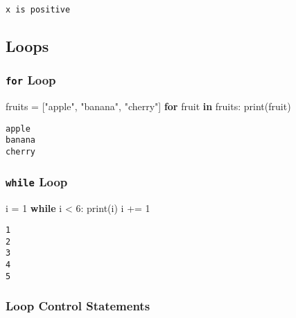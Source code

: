 \documentclass[
  letterpaper,
  DIV=11,
  numbers=noendperiod]{scrreprt}
\newenvironment{Shaded}{\begin{snugshade}}{\end{snugshade}}
\newcommand{\BuiltInTok}[1]{\textcolor[rgb]{0.00,0.23,0.31}{#1}}
\newcommand{\ControlFlowTok}[1]{\textcolor[rgb]{0.00,0.23,0.31}{\textbf{#1}}}
\newcommand{\DecValTok}[1]{\textcolor[rgb]{0.68,0.00,0.00}{#1}}
\newcommand{\KeywordTok}[1]{\textcolor[rgb]{0.00,0.23,0.31}{\textbf{#1}}}
\newcommand{\NormalTok}[1]{\textcolor[rgb]{0.00,0.23,0.31}{#1}}
\newcommand{\OperatorTok}[1]{\textcolor[rgb]{0.37,0.37,0.37}{#1}}
\newcommand{\StringTok}[1]{\textcolor[rgb]{0.13,0.47,0.30}{#1}}
\begin{document}
\begin{verbatim}
x is positive
\end{verbatim}

\subsection{Loops}\label{loops-1}

\subsubsection{\texorpdfstring{\texttt{for}
Loop}{for Loop}}\label{for-loop-1}

\begin{Shaded}
\begin{Highlighting}[]
\NormalTok{fruits }\OperatorTok{=}\NormalTok{ [}\StringTok{"apple"}\NormalTok{, }\StringTok{"banana"}\NormalTok{, }\StringTok{"cherry"}\NormalTok{]}
\ControlFlowTok{for}\NormalTok{ fruit }\KeywordTok{in}\NormalTok{ fruits:}
    \BuiltInTok{print}\NormalTok{(fruit)}
\end{Highlighting}
\end{Shaded}

\begin{verbatim}
apple
banana
cherry
\end{verbatim}

\subsubsection{\texorpdfstring{\texttt{while}
Loop}{while Loop}}\label{while-loop-1}

\begin{Shaded}
\begin{Highlighting}[]
\NormalTok{i }\OperatorTok{=} \DecValTok{1}
\ControlFlowTok{while}\NormalTok{ i }\OperatorTok{\textless{}} \DecValTok{6}\NormalTok{:}
    \BuiltInTok{print}\NormalTok{(i)}
\NormalTok{    i }\OperatorTok{+=} \DecValTok{1}
\end{Highlighting}
\end{Shaded}

\begin{verbatim}
1
2
3
4
5
\end{verbatim}

\subsubsection{Loop Control Statements}\label{loop-control-statements}
\end{document}
